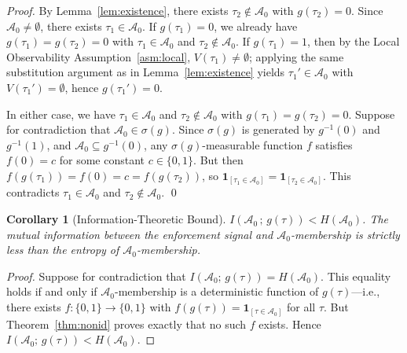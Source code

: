 \documentclass[11pt]{article}
\newtheorem{corollary}[theorem]{Corollary}
\newcommand{\Azero}{\mathcal{A}_0}
\newcommand{\sigg}{\sigma(g)}
\newcommand{\Ind}[1]{\mathbf{1}_{[#1]}}
\begin{document}
\begin{proof}
By Lemma~\ref{lem:existence}, there exists $\tau_2 \notin \Azero$ with
$g(\tau_2) = 0$.  Since $\Azero \neq \emptyset$, there exists
$\tau_1 \in \Azero$.  If $g(\tau_1) = 0$, we already have
$g(\tau_1) = g(\tau_2) = 0$ with $\tau_1 \in \Azero$ and $\tau_2 \notin \Azero$.
If $g(\tau_1) = 1$, then by the Local Observability Assumption~\ref{asm:local},
$V(\tau_1) \neq \emptyset$; applying the same substitution argument as in
Lemma~\ref{lem:existence} yields $\tau_1' \in \Azero$ with
$V(\tau_1') = \emptyset$, hence $g(\tau_1') = 0$.

In either case, we have $\tau_1 \in \Azero$ and $\tau_2 \notin \Azero$ with
$g(\tau_1) = g(\tau_2) = 0$.  Suppose for contradiction that
$\Azero \in \sigg$.  Since $\sigg$ is generated by $g^{-1}(0)$ and
$g^{-1}(1)$, and $\Azero \subseteq g^{-1}(0)$, any $\sigg$-measurable
function $f$ satisfies $f(0) = c$ for some constant $c \in \{0,1\}$.  But
then $f(g(\tau_1)) = f(0) = c = f(g(\tau_2))$, so
$\Ind{\tau_1 \in \Azero} = \Ind{\tau_2 \in \Azero}$.
This contradicts $\tau_1 \in \Azero$ and $\tau_2 \notin \Azero$.  \qed
\end{proof}

\begin{corollary}[Information-Theoretic Bound]
\label{cor:info}
$I(\Azero \,;\, g(\tau)) < H(\Azero)$.
The mutual information between the enforcement signal and $\Azero$-membership
is strictly less than the entropy of $\Azero$-membership.
\end{corollary}

\begin{proof}
Suppose for contradiction that $I(\Azero;\,g(\tau)) = H(\Azero)$.
This equality holds if and only if $\Azero$-membership is a deterministic
function of $g(\tau)$---i.e., there exists $f:\{0,1\}\to\{0,1\}$ with
$f(g(\tau)) = \mathbf{1}_{[\tau\in\Azero]}$ for all $\tau$.
But Theorem~\ref{thm:nonid} proves exactly that no such $f$ exists.
Hence $I(\Azero;\,g(\tau)) < H(\Azero)$.
\end{proof}
\end{document}
